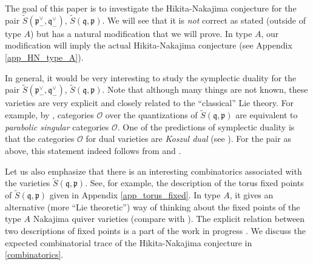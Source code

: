 \documentclass[12pt]{amsart}
\begin{document}
    
    
    
The goal of this paper is to investigate the Hikita-Nakajima conjecture for the pair $\widetilde{S}(\mathfrak{p}^\vee_-,\mathfrak{q}^\vee_-)$, $\widetilde{S}(\mathfrak{q},\mathfrak{p})$. We will see that it is {\emph{not}} correct as stated (outside of type $A$) but has a natural modification that we will prove. In type $A$, our modification will imply the actual Hikita-Nakajima conjecture (see Appendix \ref{app_HN_type_A}).

In general, it would be very interesting to study the symplectic duality for the pair $\widetilde{S}(\mathfrak{p}^\vee_-,\mathfrak{q}^\vee_-)$, $\widetilde{S}(\mathfrak{q},\mathfrak{p})$. Note that although many things are not known, these varieties are very explicit and closely related to the ``classical'' Lie theory. For example, by \cite{w}, categories $\mathcal{O}$ over the quantizations of $\widetilde{S}(\mathfrak{q},\mathfrak{p})$ are equivalent to {\emph{parabolic singular}} categories $\mathcal{O}$. One of the predictions of symplectic duality is that the categories $\mathcal{O}$ for dual varieties are {\emph{Koszul dual}} (see \cite[Section 10.1]{BPWII}). For the pair as above, this statement indeed follows from \cite{bak_koszul} and \cite{w}. 

Let us also emphasize that there is an interesting combinatorics associated with the varieties $\widetilde{S}(\mathfrak{q},\mathfrak{p})$. See, for example, the description of the torus fixed points of $\widetilde{S}(\mathfrak{q},\mathfrak{p})$ given in Appendix \ref{app_torus_fixed}. In type $A$, it gives an alternative (more ``Lie theoretic'') way of thinking about the fixed points of the type $A$ Nakajima quiver varieties (compare with \cite[Section 3.4]{dinkins_elliptic_of_type_A}). The explicit relation between two descriptions of fixed points is a part of the work in progress \cite{losev_krylov_wc_for_gieseker}. We discuss the expected combinatorial trace of the Hikita-Nakajima conjecture in \cref{combinatorics}.

    
    
    
    
    
    
    
    
 
 
\end{document}
